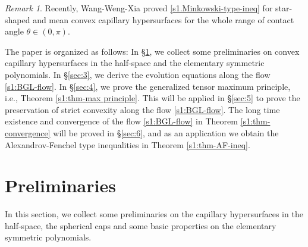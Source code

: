 \documentclass[11pt,reqno]{amsart}
\theoremstyle{definition}
\theoremstyle{remark}
\newtheorem{rem}{Remark}
\numberwithin{equation}{section}
\renewcommand{\(}{\left(}
\renewcommand{\)}{\right)}
\renewcommand{\-}{\overline}
\begin{document}
\begin{rem}
Recently, Wang-Weng-Xia \cite{WWX23} proved \eqref{s1.Minkowski-type-ineq} for star-shaped and mean convex capillary hypersurfaces for the whole range of contact
angle $\theta\in (0,\pi)$.
\end{rem}

The paper is organized as follows: In \S \ref{sec:2}, we collect some preliminaries on convex capillary hypersurfaces in the half-space and the elementary symmetric polynomials.  In \S \ref{sec:3}, we derive the evolution equations along the flow \eqref{s1:BGL-flow}. In \S \ref{sec:4}, we prove the generalized tensor maximum principle, i.e., Theorem \ref{s1:thm-max principle}. This will be applied in \S \ref{sec:5} to prove the preservation of strict convexity along the flow \eqref{s1:BGL-flow}. The long time existence and convergence of the flow \eqref{s1:BGL-flow} in Theorem \ref{s1:thm-convergence} will be proved in \S \ref{sec:6}, and as an application we obtain the Alexandrov-Fenchel type inequalities  in Theorem \ref{s1:thm-AF-ineq}.


\section{Preliminaries}\label{sec:2}

In this section, we collect some preliminaries on the capillary hypersurfaces in the half-space, the spherical caps and some basic properties on the elementary symmetric polynomials.
\end{document}

